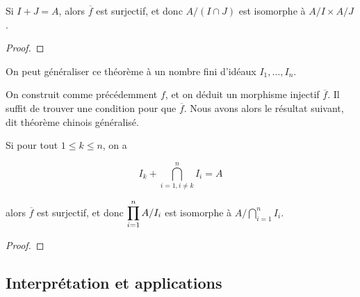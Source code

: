\begin{theorem}
	Si $I + J = A$, alors $\overline{f}$ est surjectif, et donc $A/(I \cap
	J)$ est isomorphe à $A/I \times A/J$.
\end{theorem}

\ifdefined\outputproof
\begin{proof}

\end{proof}
\fi

On peut généraliser ce théorème à un nombre fini d'idéaux $I_{1}, \ldots,
I_{n}$.

On construit comme précédemment $f$, et on déduit un morphisme injectif
$\overline{f}$. Il suffit de trouver une condition pour que $\overline{f}$. Nous
avons alors le résultat suivant, dit théorème chinois généralisé.

\begin{theorem}
	Si pour tout $1 \leq k \leq n$, on a
	
	\begin{equation}
		I_{k} + \displaystyle \bigcap_{{i = 1, i \neq k}}^{n} I_{i} = A
	\end{equation}

	alors $\overline{f}$ est surjectif, et
	donc $\displaystyle \prod_{i = 1}^{n} A/I_{i}$ est isomorphe à $\displaystyle A/\bigcap_{i = 1}^{n}
	I_{i}$.
\end{theorem}

\ifdefined\outputproof
\begin{proof}

\end{proof}
\fi

\subsection{Interprétation et applications}

